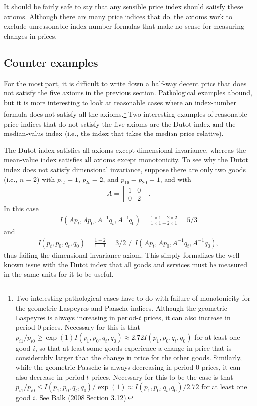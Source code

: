 \documentclass[]{article}
\begin{document}
It should be fairly safe to say that any sensible price index should satisfy these axioms. Although there are many price indices that do, the axioms work to exclude unreasonable index-number formulas that make no sense for measuring changes in prices.

\hypertarget{counter-examples}{%
\subsection{Counter examples}\label{counter-examples}}

For the most part, it is difficult to write down a half-way decent price that does not satisfy the five axioms in the previous section. Pathological examples abound, but it is more interesting to look at reasonable cases where an index-number formula does not satisfy all the axioms.\footnote{Two interesting pathological cases have to do with failure of monotonicity for the geometric Laspeyres and Paasche indices. Although the geometric Laspeyres is always increasing in period-\(t\) prices, it can also increase in period-0 prices. Necessary for this is that \(p_{i1} / p_{i0} \geq \exp(1) I(p_{1}, p_{0}, q_{t}, q_{0}) \approx 2.72 I(p_{1}, p_{0}, q_{t}, q_{0})\) for at least one good \(i\), so that at least some goods experience a change in price that is considerably larger than the change in price for the other goods. Similarly, while the geometric Paasche is always decreasing in period-0 prices, it can also decrease in period-\(t\) prices. Necessary for this to be the case is that \(p_{i1} / p_{i0} \leq I(p_{1}, p_{0}, q_{t}, q_{0}) / \exp(1) \approx I(p_{1}, p_{0}, q_{t}, q_{0}) / 2.72\) for at least one good \(i\). See Balk (2008 Section 3.12).} Two interesting examples of reasonable price indices that do not satisfy the five axioms are the Dutot index and the median-value index (i.e., the index that takes the median price relative).

The Dutot index satisfies all axioms except dimensional invariance, whereas the mean-value index satisfies all axioms except monotonicity. To see why the Dutot index does not satisfy dimensional invariance, suppose there are only two goods (i.e., \(n = 2\)) with \(p_{1t} = 1\), \(p_{2t} = 2\), and \(p_{10} = p_{20} = 1\), and with
\begin{align*}
A = 
\begin{bmatrix}
1 & 0 \\
0 & 2
\end{bmatrix}.
\end{align*}
In this case
\begin{align*}
I(Ap_{t}, Ap_{0}, A^{-1}q_{t}, A^{-1}q_{0}) = \frac{1 \times 1 + 2 \times 2}{1 \times 1 + 2 \times 1} = 5 / 3
\end{align*}
and
\begin{align*}
I(p_{t}, p_{0}, q_{t}, q_{0}) = \frac{1 + 2}{1 + 1} = 3 / 2 \neq I(Ap_{t}, Ap_{0}, A^{-1}q_{t}, A^{-1}q_{0}),
\end{align*}
thus failing the dimensional invariance axiom. This simply formalizes the well known issue with the Dutot index that all goods and services must be measured in the same units for it to be useful.
\end{document}
